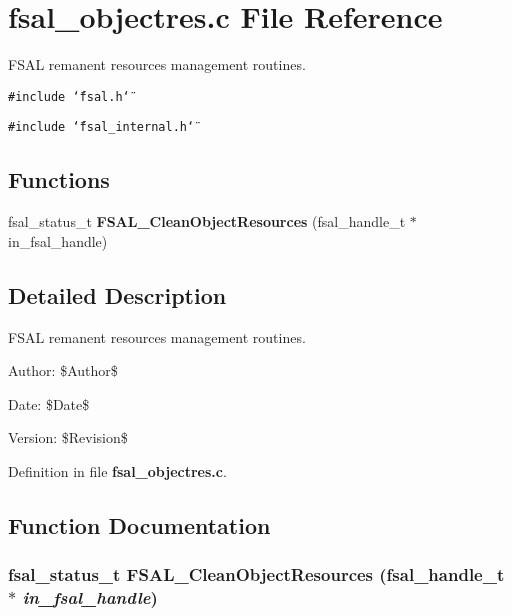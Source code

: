 \section{fsal\_\-objectres.c File Reference}
\label{fsal__objectres_8c}
FSAL remanent resources management routines. 

{\tt \#include \char`\"{}fsal.h\char`\"{}}\par
{\tt \#include \char`\"{}fsal\_\-internal.h\char`\"{}}\par
\subsection*{Functions}
\begin{CompactItemize}
\item 
fsal\_\-status\_\-t {\bf FSAL\_\-Clean\-Object\-Resources} (fsal\_\-handle\_\-t $\ast$in\_\-fsal\_\-handle)
\end{CompactItemize}


\subsection{Detailed Description}
FSAL remanent resources management routines. 

\begin{Desc}
\item[Author:]\$Author\$ \end{Desc}
\begin{Desc}
\item[Date:]\$Date\$ \end{Desc}
\begin{Desc}
\item[Version:]\$Revision\$ \end{Desc}


Definition in file {\bf fsal\_\-objectres.c}.

\subsection{Function Documentation}
\subsubsection{\setlength{\rightskip}{0pt plus 5cm}fsal\_\-status\_\-t FSAL\_\-Clean\-Object\-Resources (fsal\_\-handle\_\-t $\ast$ {\em in\_\-fsal\_\-handle})}\label{fsal__objectres_8c_a0}


